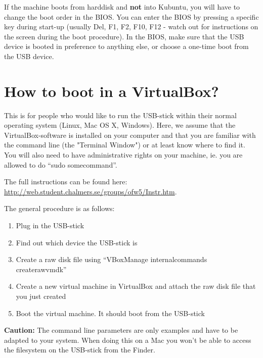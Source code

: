 \documentclass[11pt,a4paper,twocolumn]{article}
\begin{document}
If the machine boots from harddisk and {\bf not} into Kubuntu, you will have to
change the boot order in the BIOS.  You can enter the BIOS by pressing a
specific key during start-up (usually Del, F1, F2, F10, F12 - watch out for
instructions on the screen during the boot procedure).  In the BIOS, make sure
that the USB device is booted in preference to anything else, or choose a
one-time boot from the USB device.

\section{How to boot in a VirtualBox?}

This is for people who would like to run the USB-stick within their normal
operating system (Linux, Mac OS X, Windows). Here, we assume that the
VirtualBox-software is installed on your computer and that you are familiar with
the command line (the "Terminal Window") or at least know where to find it. You
will also need to have administrative rights on your machine, ie. you are
allowed to do ``sudo somecommand''.
\begin{latexonly}
The full instructions can be found here:
\href{http://web.student.chalmers.se/groups/ofw5/Instr.htm}{http://web.student.chalmers.se/groups/ofw5/Instr.htm}.
\end{latexonly}
\begin{htmlonly}
The general procedure is as follows:
%
\begin{enumerate}
\item Plug in the USB-stick
\item Find out which device the USB-stick is
\item Create a raw disk file using ``VBoxManage internalcommands
  createrawvmdk''
\item Create a new virtual machine in VirtualBox and attach the raw disk file
  that you just created
\item Boot the virtual machine. It should boot from the USB-stick
\end{enumerate}
%
{\bf Caution:} The command line parameters are only examples and have to be
adapted to your system. When doing this on a Mac you won't be able to access the
filesystem on the USB-stick from the Finder.
\end{htmlonly}
\end{document}
